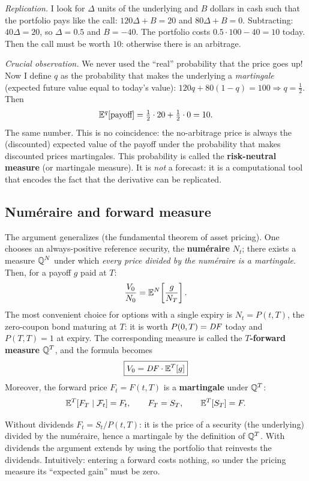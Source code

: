 \emph{Replication.} I look for $\Delta$ units of the underlying and $B$ dollars in cash such that the portfolio pays
like the call: $120\Delta+B=20$ and $80\Delta+B=0$. Subtracting: $40\Delta=20$, so $\Delta=0.5$ and $B=-40$. The
portfolio costs $0.5\cdot100-40=10$ today. Then the call must be worth $10$: otherwise there is an arbitrage.

\emph{Crucial observation.} We never used the ``real'' probability that the price goes up! Now I define $q$ as the
probability that makes the underlying a \emph{martingale} (expected future value equal to today's value):
$120q+80(1-q)=100\Rightarrow q=\tfrac12$. Then
\[
\mathbb{E}^q[\text{payoff}]=\tfrac12\cdot20+\tfrac12\cdot0=10 .
\]
The same number. This is no coincidence: the no-arbitrage price is always the (discounted) expected value of the
payoff under the probability that makes discounted prices martingales. This probability is called the
\textbf{risk-neutral measure} (or martingale measure). It is \emph{not} a forecast: it is a computational tool that
encodes the fact that the derivative can be replicated.

\subsection{Numéraire and forward measure}
The argument generalizes (the fundamental theorem of asset pricing). One chooses an always-positive reference
security, the \textbf{numéraire} $N_t$; there exists a measure $\mathbb{Q}^N$ under which \emph{every price divided by the
numéraire is a martingale}. Then, for a payoff $g$ paid at $T$:
\[
\frac{V_0}{N_0}=\mathbb{E}^N\!\left[\frac{g}{N_T}\right].
\]
The most convenient choice for options with a single expiry is $N_t=P(t,T)$, the zero-coupon bond maturing at $T$:
it is worth $P(0,T)=\mathit{DF}$ today and $P(T,T)=1$ at expiry. The corresponding measure is called the \textbf{$T$-forward
measure} $\Q^T$, and the formula becomes
\begin{equation}\label{eq:prezzo-forward-misura}
\boxed{V_0=\mathit{DF}\cdot\mathbb{E}^T[g]}
\end{equation}
Moreover, the forward price $F_t=F(t,T)$ is a \textbf{martingale} under $\Q^T$:
\begin{equation}
\mathbb{E}^T[F_T\mid\mathcal F_t]=F_t,\qquad F_T=S_T,\qquad \mathbb{E}^T[S_T]=F.
\end{equation}

\begin{perche}[title={Why is the forward a martingale under $\Q^T$?}]
Without dividends $F_t=S_t/P(t,T)$: it is the price of a security (the underlying) divided by the numéraire, hence a
martingale by the definition of $\Q^T$. With dividends the argument extends by using the portfolio that reinvests
the dividends. Intuitively: entering a forward costs nothing, so under the pricing measure its ``expected gain'' must
be zero.
\end{perche}

